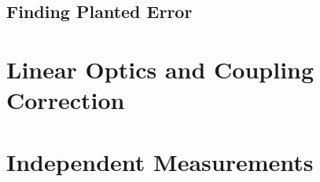 \subsection{Finding Planted Error}
\section{Linear Optics and Coupling Correction}
\section{Independent Measurements}
